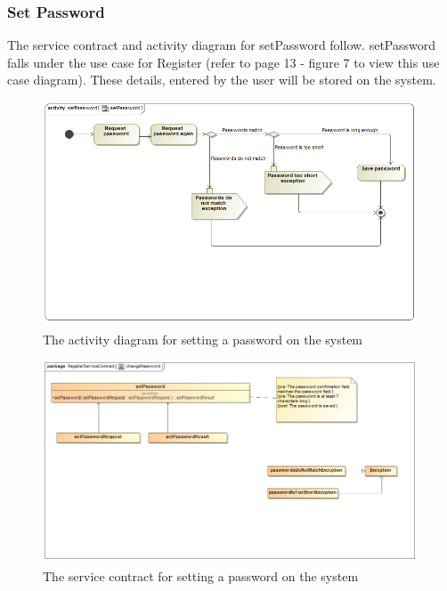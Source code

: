 \documentclass[a4paper,12pt]{report}
\begin{document}
\subsubsection{Set Password}
The service contract and activity diagram for setPassword follow. setPassword falls under the use case for Register (refer to page 13 - figure 7 to view this use case diagram). These details, entered by the user will be stored on the system.
\begin{figure}[H]
  \centering
    \includegraphics[width=1.0\textwidth]{../Diagrams/Register/ActivityDiagrams/setPassword1.png}
    \caption{The activity diagram for setting a password on the system} 
\end{figure}
\begin{figure}[H]
  \centering
    \includegraphics[width=1.0\textwidth]{../Diagrams/Register/ServiceContractsRegister/changePasswordServiceContract.png}
    \caption{The service contract for setting a password on the system} 
\end{figure}
\end{document}
